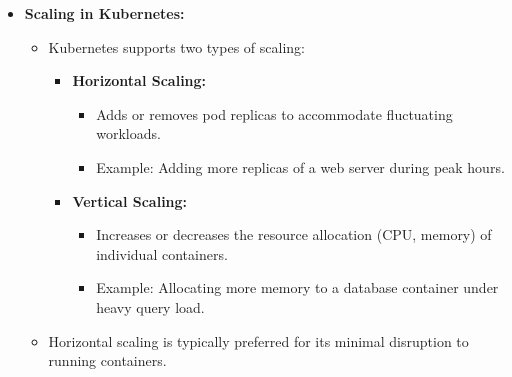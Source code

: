 \documentclass[conference]{IEEEtran}
\begin{document}
\begin{itemize}
    \item \textbf{Scaling in Kubernetes:}
    \begin{itemize}
        \item Kubernetes supports two types of scaling:
        \begin{itemize}
            \item \textbf{Horizontal Scaling:}
            \begin{itemize}
                \item Adds or removes pod replicas to accommodate fluctuating workloads.
                \item Example: Adding more replicas of a web server during peak hours.
            \end{itemize}
            \item \textbf{Vertical Scaling:}
            \begin{itemize}
                \item Increases or decreases the resource allocation (CPU, memory) of individual containers.
                \item Example: Allocating more memory to a database container under heavy query load.
            \end{itemize}
        \end{itemize}
        \item Horizontal scaling is typically preferred for its minimal disruption to running containers.
    \end{itemize}
    

\end{itemize}
\end{document}
